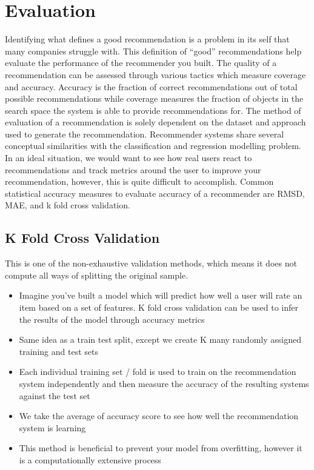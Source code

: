 \section{Evaluation}
Identifying what defines a good recommendation is a problem in its self that many companies struggle with. This definition of “good” recommendations help evaluate the performance of the recommender you built. 
The quality of a recommendation can be assessed through various tactics which measure coverage and accuracy. 
Accuracy is the fraction of correct recommendations out of total possible recommendations while coverage measures the fraction of objects in the search space the system is able to provide recommendations for. 
The method of evaluation of a recommendation is solely dependent on the dataset and approach used to generate the recommendation. 
Recommender systems share several conceptual similarities with the classification and regression modelling problem. 
In an ideal situation, we would want to see how real users react to recommendations and track metrics around the user to improve your recommendation, however, this is quite difficult to accomplish. 
Common statistical accuracy measures to evaluate accuracy of a recommender are RMSD, MAE, and k fold cross validation.

\subsection{K Fold Cross Validation}
This is one of the non-exhaustive validation methods, which means it does not compute all ways of splitting the original sample.
\begin{itemize}
\item Imagine you’ve built a model which will predict how well a user will rate an item based on a set of features. K fold cross validation can be used to infer the results of the model through accuracy metrics
\item Same idea as a train test split, except we create K many randomly assigned training and test sets
\item Each individual training set / fold is used to train on the recommendation system independently and then measure the accuracy of the resulting systems against the test set
\item We take the average of accuracy score to see how well the recommendation system is learning
\item This method is beneficial to prevent your model from overfitting, however it is a computationally extensive process
\end{itemize}


